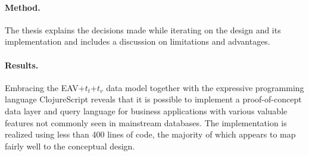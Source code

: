 \paragraph{Method.}
The thesis explains the decisions made while iterating on the design and its implementation and includes a discussion on limitations and advantages.

\paragraph{Results.}
Embracing the EAV+$t_t$+$t_v$ data model together with the expressive programming language ClojureScript reveals that it is possible to implement a proof-of-concept data layer and query language for business applications with various valuable features not commonly seen in mainstream databases. The implementation is realized using less than 400 lines of code, the majority of which appears to map fairly well to the conceptual design.
